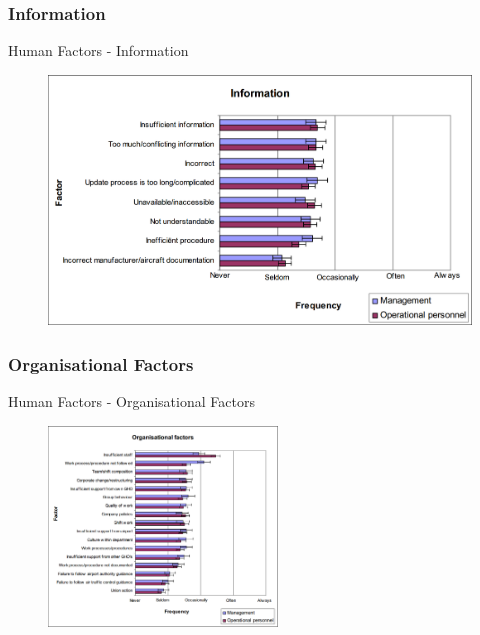 \subsubsection{Information}
\begin{frame}{Human Factors - Information}{}
	\begin{figure}[H]
	\centering
	\includegraphics[width=\textwidth]{Grafik/Information}
\end{figure}
\end{frame}

\subsubsection{Organisational Factors}
\begin{frame}{Human Factors - Organisational Factors}{}
	\begin{figure}[H]
	\centering
	\includegraphics[width=230px]{Grafik/OrganisationalFactors}
\end{figure}
\end{frame}